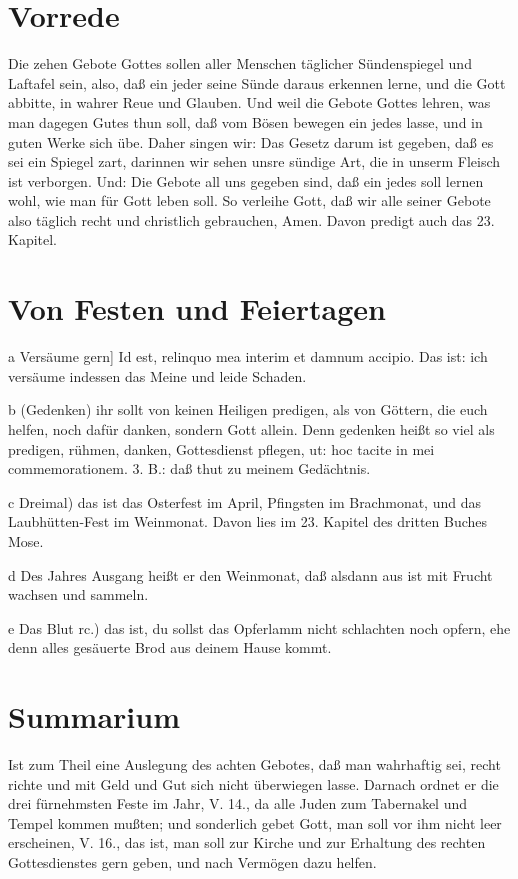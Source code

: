 \section{Vorrede}

Die zehen Gebote Gottes sollen aller Menschen täglicher Sündenspiegel und Laftafel sein, also, daß ein jeder seine Sünde daraus erkennen lerne, und die Gott abbitte, in wahrer Reue und Glauben. Und weil die Gebote Gottes lehren, was man dagegen Gutes thun soll, daß vom Bösen bewegen ein jedes lasse, und in guten Werke sich übe. Daher singen wir: Das Gesetz darum ist gegeben, daß es sei ein Spiegel zart, darinnen wir sehen unsre sündige Art, die in unserm Fleisch ist verborgen. Und: Die Gebote all uns gegeben sind, daß ein jedes soll lernen wohl, wie man für Gott leben soll. So verleihe Gott, daß wir alle seiner Gebote also täglich recht und christlich gebrauchen, Amen. Davon predigt auch das 23. Kapitel.

\section{Von Festen und Feiertagen}

a Versäume gern] Id est, relinquo mea interim et damnum accipio. Das ist: ich versäume indessen das Meine und leide Schaden.

b (Gedenken) ihr sollt von keinen Heiligen predigen, als von Göttern, die euch helfen, noch dafür danken, sondern Gott allein. Denn gedenken heißt so viel als predigen, rühmen, danken, Gottesdienst pflegen, ut: hoc tacite in mei commemorationem. 3. B.: daß thut zu meinem Gedächtnis.

c Dreimal) das ist das Osterfest im April, Pfingsten im Brachmonat, und das Laubhütten-Fest im Weinmonat. Davon lies im 23. Kapitel des dritten Buches Mose.

d Des Jahres Ausgang heißt er den Weinmonat, daß alsdann aus ist mit Frucht wachsen und sammeln.

e Das Blut rc.) das ist, du sollst das Opferlamm nicht schlachten noch opfern, ehe denn alles gesäuerte Brod aus deinem Hause kommt.

\section{Summarium}

Ist zum Theil eine Auslegung des achten Gebotes, daß man wahrhaftig sei, recht richte und mit Geld und Gut sich nicht überwiegen lasse. Darnach ordnet er die drei fürnehmsten Feste im Jahr, V. 14., da alle Juden zum Tabernakel und Tempel kommen mußten; und sonderlich gebet Gott, man soll vor ihm nicht leer erscheinen, V. 16., das ist, man soll zur Kirche und zur Erhaltung des rechten Gottesdienstes gern geben, und nach Vermögen dazu helfen.

